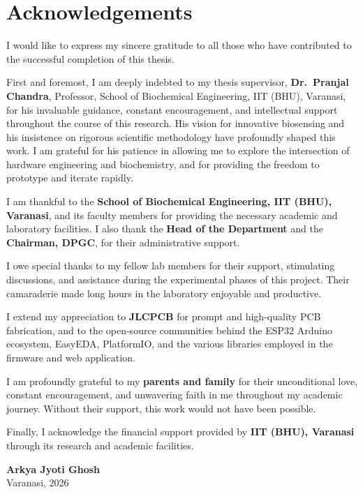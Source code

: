 \chapter*{Acknowledgements}
\thispagestyle{plain}

I would like to express my sincere gratitude to all those who have contributed to the successful completion of this thesis.

First and foremost, I am deeply indebted to my thesis supervisor, \textbf{Dr.\ Pranjal Chandra}, Professor, School of Biochemical Engineering, IIT (BHU), Varanasi, for his invaluable guidance, constant encouragement, and intellectual support throughout the course of this research. His vision for innovative biosensing and his insistence on rigorous scientific methodology have profoundly shaped this work. I am grateful for his patience in allowing me to explore the intersection of hardware engineering and biochemistry, and for providing the freedom to prototype and iterate rapidly.

I am thankful to the \textbf{School of Biochemical Engineering, IIT (BHU), Varanasi}, and its faculty members for providing the necessary academic and laboratory facilities. I also thank the \textbf{Head of the Department} and the \textbf{Chairman, DPGC}, for their administrative support.

I owe special thanks to my fellow lab members for their support, stimulating discussions, and assistance during the experimental phases of this project. Their camaraderie made long hours in the laboratory enjoyable and productive.

I extend my appreciation to \textbf{JLCPCB} for prompt and high-quality PCB fabrication, and to the open-source communities behind the ESP32 Arduino ecosystem, EasyEDA, PlatformIO, and the various libraries employed in the firmware and web application.

I am profoundly grateful to my \textbf{parents and family} for their unconditional love, constant encouragement, and unwavering faith in me throughout my academic journey. Without their support, this work would not have been possible.

Finally, I acknowledge the financial support provided by \textbf{IIT (BHU), Varanasi} through its research and academic facilities.

\vspace{1.5cm}
\noindent\hfill \textbf{Arkya Jyoti Ghosh}\\
\hfill Varanasi, 2026
